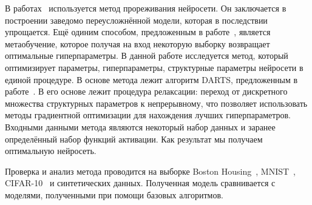 \documentclass[12pt,twoside]{article}
\begin{document}
	В работах~\cite{cun1990, graves2011} используется метод прореживания нейросети. Он заключается в построении заведомо переусложнённой модели, которая в последствии упрощается. Ещё одиним способом, предложенным в работе~\cite{Maclaurin:2015:GHO:3045118.3045343}, является метаобучение, которое получая на вход некоторую выборку возвращает оптимальные гиперпараметры.
	В данной работе исследуется метод, который оптимизирует параметры, гиперпараметры, структурные параметры нейросети в единой процедуре. В основе метода лежит алгоритм DARTS, предложенным в работе~\cite{liu2018darts}. В его основе лежит процедура релаксации: переход от дискретного множества структурных параметров к непрерывному, что позволяет использовать методы градиентной оптимизации для нахождения лучших гиперпараметров. Входными данными метода являются некоторый набор данных и заранее определённый набор функций активации. Как результат мы получаем оптимальную нейросеть.
	
	Проверка и анализ метода проводится на выборке Boston Housing~\cite{Boston}, MNIST~\cite{MNIST},  CIFAR-10~\cite{CIFAR-10} и синтетических данных. Полученная модель сравнивается с моделями, полученными при помощи базовых алгоритмов.
	 



\end{document}
